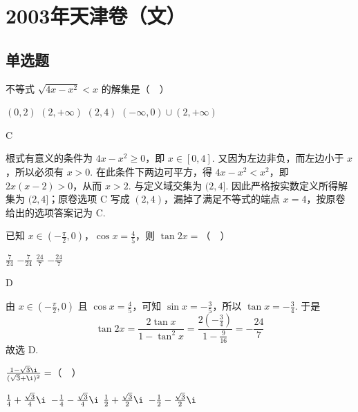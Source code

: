 \chapter{2003年天津卷（文）}
\section{单选题}
\begin{problem}
不等式 \(\sqrt{4x - x^2} < x\) 的解集是（\(\quad\)）

\choices
    {\((0,2)\)}
    {\((2,+\infty)\)}
    {\((2,4)\)}
    {\((-\infty,0)\cup(2,+\infty)\)}
\end{problem}

\begin{answer}
C
\end{answer}

\begin{solution}
根式有意义的条件为 \(4x-x^2\geqslant0\)，即 \(x\in[0,4]\). 又因为左边非负，而左边小于 \(x\)，所以必须有 \(x>0\). 在此条件下两边可平方，得 \(4x-x^2<x^2\)，即 \(2x(x-2)>0\)，从而 \(x>2\). 与定义域交集为 \((2,4]\). 因此严格按实数定义所得解集为 \((2,4]\)；原卷选项 C 写成 \((2,4)\)，漏掉了满足不等式的端点 \(x=4\)，按原卷给出的选项答案记为 C.
\end{solution}

\begin{problem}
已知 \(x \in \left(-\frac{\pi}{2},0\right)\)，\(\cos x = \frac{4}{5}\)，则 \(\tan 2x =\)（\(\quad\)）

\choices
    {\(\frac{7}{24}\)}
    {\(-\frac{7}{24}\)}
    {\(\frac{24}{7}\)}
    {\(-\frac{24}{7}\)}
\end{problem}

\begin{answer}
D
\end{answer}

\begin{solution}
由 \(x\in\left(-\frac{\pi}{2},0\right)\) 且 \(\cos x=\frac45\)，可知 \(\sin x=-\frac35\)，所以 \(\tan x=-\frac34\). 于是
\[
\tan 2x=\frac{2\tan x}{1-\tan^2x}=\frac{2\left(-\frac34\right)}{1-\frac{9}{16}}=-\frac{24}{7}
\]
故选 D.
\end{solution}

\begin{problem}
\(\frac{1 - \sqrt{3}\i}{(\sqrt{3} + \i)^2} =\)（\(\quad\)）

\choices
    {\(\frac{1}{4} + \frac{\sqrt{3}}{4}\i\)}
    {\(-\frac{1}{4} - \frac{\sqrt{3}}{4}\i\)}
    {\(\frac{1}{2} + \frac{\sqrt{3}}{2}\i\)}
    {\(-\frac{1}{2} - \frac{\sqrt{3}}{2}\i\)}
\end{problem}

